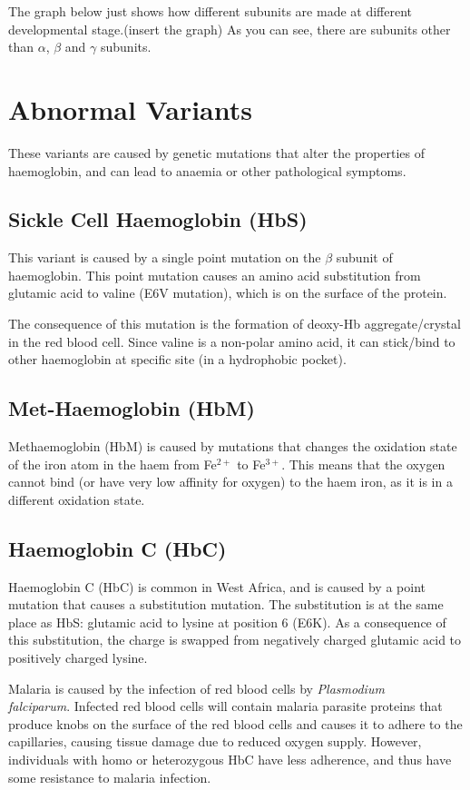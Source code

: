 \documentclass[a4paper, 12pt]{report}
\begin{document}
The graph below just shows how different subunits are made at different developmental stage.(insert the graph)
As you can see, there are subunits other than $\alpha$, $\beta$ and $\gamma$ subunits.

\section{Abnormal Variants}

These variants are caused by genetic mutations that alter the properties of haemoglobin, and can lead to anaemia or other pathological symptoms.

\subsection{Sickle Cell Haemoglobin (HbS)}

This variant is caused by a single point mutation on the $\beta$ subunit of haemoglobin.
This point mutation causes an amino acid substitution from glutamic acid to valine (E6V mutation), which is on the surface of the protein.

The consequence of this mutation is the formation of deoxy-Hb aggregate/crystal in the red blood cell.
Since valine is a non-polar amino acid, it can stick/bind to other haemoglobin at specific site (in a hydrophobic pocket).

\subsection{Met-Haemoglobin (HbM)}

Methaemoglobin (HbM) is caused by mutations that changes the oxidation state of the iron atom in the haem from Fe$^{2+}$ to Fe$^{3+}$.
This means that the oxygen cannot bind (or have very low affinity for oxygen) to the haem iron, as it is in a different oxidation state.

\subsection{Haemoglobin C (HbC)}

Haemoglobin C (HbC) is common in West Africa, and is caused by a point mutation that causes a substitution mutation.
The substitution is at the same place as HbS: glutamic acid to lysine at position 6 (E6K).
As a consequence of this substitution, the charge is swapped from negatively charged glutamic acid to positively charged lysine.

Malaria is caused by the infection of red blood cells by \textit{Plasmodium \\falciparum}.
Infected red blood cells will contain malaria parasite proteins that produce knobs on the surface of the red blood cells and causes it to adhere to the capillaries, causing tissue damage due to reduced oxygen supply.
However, individuals with homo or heterozygous HbC have less adherence, and thus have some resistance to malaria infection.
\end{document}
